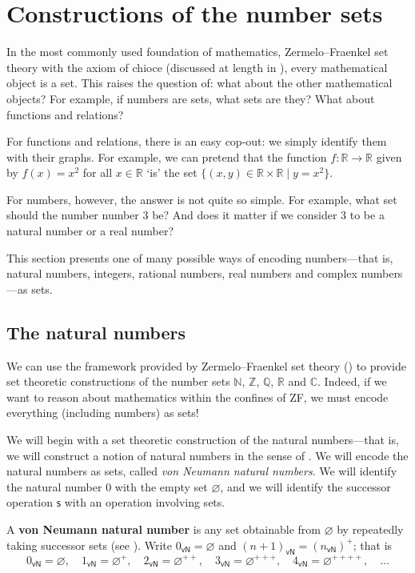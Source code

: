\section{Constructions of the number sets}

In the most commonly used foundation of mathematics, Zermelo--Fraenkel set theory with the axiom of chioce (discussed at length in ), every mathematical object is a set. This raises the question of: what about the other mathematical objects? For example, if numbers are sets, what sets are they? What about functions and relations?

For functions and relations, there is an easy cop-out: we simply identify them with their graphs. For example, we can pretend that the function $f : \mathbb{R} \to \mathbb{R}$ given by $f(x) = x^2$ for all $x \in \mathbb{R}$ `is' the set $\{ (x,y) \in \mathbb{R} \times \mathbb{R} \mid y = x^2 \}$.

For numbers, however, the answer is not quite so simple. For example, what set should the number number $3$ be? And does it matter if we consider $3$ to be a natural number or a real number?

This section presents one of many possible ways of encoding numbers---that is, natural numbers, integers, rational numbers, real numbers and complex numbers---as sets.

\subsection*{The natural numbers}

We can use the framework provided by Zermelo--Fraenkel set theory () to provide set theoretic constructions of the number sets $\mathbb{N}$, $\mathbb{Z}$, $\mathbb{Q}$, $\mathbb{R}$ and $\mathbb{C}$. Indeed, if we want to reason about mathematics within the confines of ZF, we must encode everything (including numbers) as sets!

We will begin with a set theoretic construction of the natural numbers---that is, we will construct a notion of natural numbers in the sense of . We will encode the natural numbers as sets, called \textit{von Neumann natural numbers}. We will identify the natural number $0$ with the empty set $\varnothing$, and we will identify the successor operation $\mathsf{s}$ with an operation involving sets.

\begin{definition}
\label{defVonNeumannNaturalNumbers}
A \textbf{von Neumann natural number} is any set obtainable from $\varnothing$ by repeatedly taking successor sets (see ). Write $0_{\mathsf{vN}} = \varnothing$ and $(n+1)_{\mathsf{vN}} = (n_{\mathsf{vN}})^+$; that is
\[ 0_{\mathsf{vN}} = \varnothing, \quad 1_{\mathsf{vN}} = \varnothing^+, \quad 2_{\mathsf{vN}} = \varnothing^{++}, \quad 3_{\mathsf{vN}} = \varnothing^{+++}, \quad 4_{\mathsf{vN}} = \varnothing^{++++}, \quad \dots \]
\end{definition}

